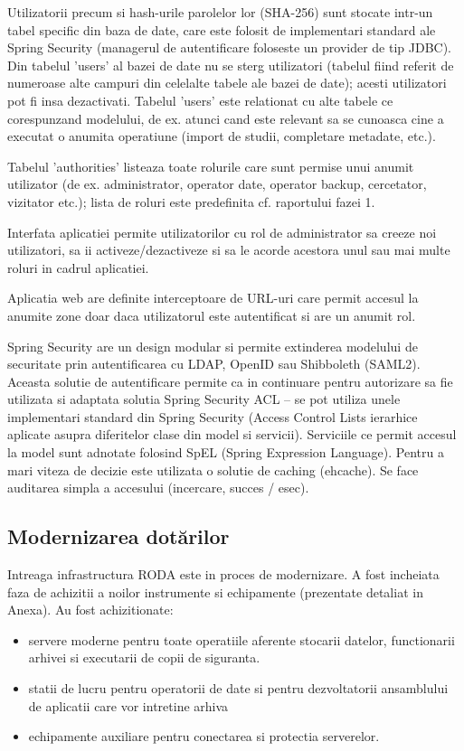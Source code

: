 \documentclass[a4paper, 10pt]{article}
\begin{document}
{\medskip

Utilizatorii precum si hash-urile parolelor lor (SHA-256) sunt stocate intr-un tabel specific din baza de date, care este folosit de implementari standard ale Spring Security (managerul de autentificare foloseste un provider de tip JDBC). 
Din tabelul 'users' al bazei de date nu se sterg utilizatori (tabelul fiind referit de numeroase alte campuri din celelalte tabele ale bazei de date); acesti utilizatori pot fi insa dezactivati.
Tabelul 'users' este relationat cu alte tabele ce corespunzand modelului, de ex. atunci cand este relevant sa se cunoasca cine a executat o anumita operatiune (import de studii, completare metadate, etc.).

Tabelul 'authorities' listeaza toate rolurile care sunt permise unui anumit utilizator (de ex. administrator, operator date, operator backup, cercetator, vizitator etc.); lista de roluri este predefinita cf. raportului fazei 1.

\medskip

Interfata aplicatiei permite utilizatorilor cu rol de administrator sa creeze noi utilizatori, sa ii activeze/dezactiveze si sa le acorde acestora unul sau mai multe roluri in cadrul aplicatiei.

Aplicatia web are definite interceptoare de URL-uri care permit accesul la anumite zone doar daca utilizatorul este autentificat si are un anumit rol.

\medskip

Spring Security are un design modular si permite extinderea modelului de securitate prin autentificarea cu LDAP, OpenID sau Shibboleth (SAML2).
Aceasta solutie de autentificare permite ca in continuare pentru autorizare sa fie utilizata si adaptata solutia Spring Security ACL --
se pot utiliza unele implementari standard din Spring Security (Access Control Lists ierarhice aplicate asupra diferitelor clase din model si servicii). 
Serviciile ce permit accesul la model sunt adnotate folosind SpEL
(Spring Expression Language).
Pentru a mari viteza de decizie este utilizata o solutie de caching (ehcache). 
Se face auditarea simpla a accesului (incercare, succes / esec). 

\medskip

\subsection*{Modernizarea dot\u{a}rilor}

\medskip

Intreaga infrastructura RODA este in proces de modernizare. 
A fost incheiata faza de achizitii a noilor instrumente si echipamente (prezentate detaliat in Anexa). Au
fost achizitionate:
\begin{itemize}
\item servere moderne pentru toate operatiile aferente stocarii datelor,
functionarii arhivei si executarii de copii de siguranta.
\item statii de lucru pentru operatorii de date si pentru dezvoltatorii
ansamblului de aplicatii care vor intretine arhiva
\item echipamente auxiliare pentru conectarea si protectia serverelor.
\end{itemize}

}
\end{document}
